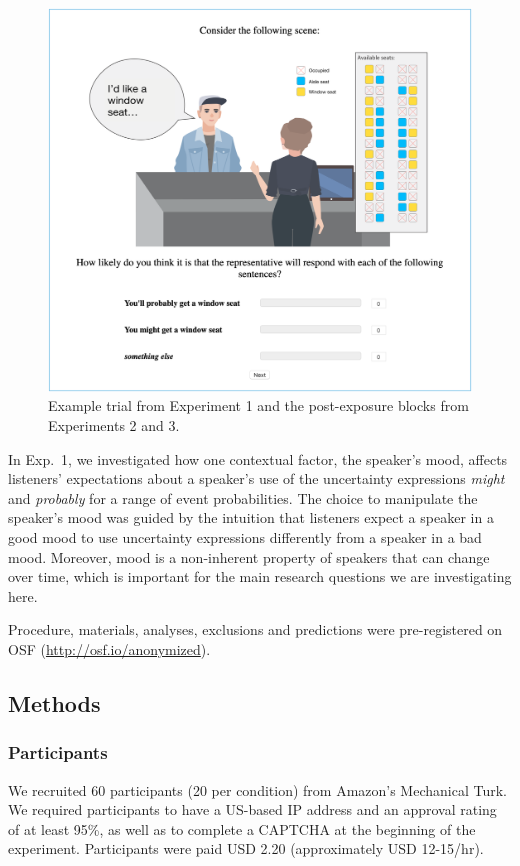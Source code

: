 \documentclass[man,floatsintext]{apa6}
\begin{document}
\begin{figure}
    \centering
    \includegraphics[width=0.6\columnwidth, trim={0 1cm 0 0cm}]{example-trial.png}
    \caption{Example trial from Experiment 1 and the post-exposure blocks from Experiments 2 and 3.}
    \label{fig:example-trial}
\end{figure}

In Exp.~1, we investigated how one contextual factor, the speaker's mood, affects listeners' expectations about a speaker's use of the uncertainty expressions \textit{might} and \textit{probably} for a range of event probabilities. The choice to manipulate the speaker's mood was guided by the intuition that listeners expect a speaker in a good mood to use uncertainty expressions differently from a speaker in a bad mood. Moreover, mood is a non-inherent property of speakers that can change over time, which is important for the main research questions we are investigating here. 

Procedure, materials, analyses, exclusions and predictions were pre-registered on OSF (\url{http://osf.io/anonymized}).



\subsection{Methods}

\subsubsection{Participants} We recruited 60 participants (20 per condition) from Amazon's Mechanical Turk. We required participants to have a US-based IP address and an approval rating of at least 95\%, as well as to complete a CAPTCHA at the beginning of the experiment. Participants were paid USD 2.20 (approximately USD 12-15/hr).
\end{document}
